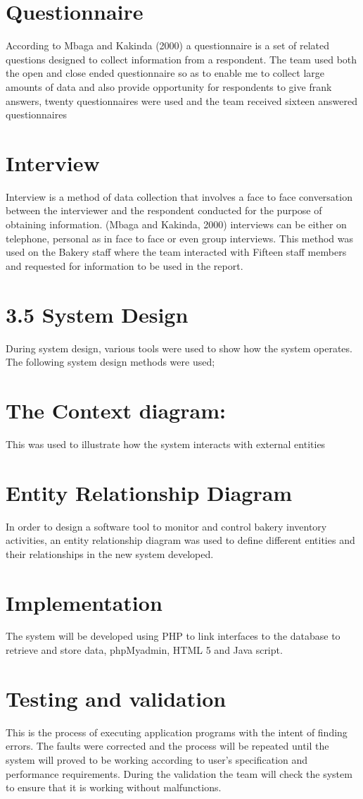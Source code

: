 \documentclass[options]{article}
\begin{document}
\section{\textbf{Questionnaire}}
According to Mbaga and Kakinda (2000) a questionnaire is a set of related questions designed to collect information from a respondent. The team used both the open and close ended questionnaire so as to enable me to collect large amounts of data and also provide opportunity for respondents to give frank answers, twenty questionnaires were used and the team received sixteen answered questionnaires
\section{\textbf{Interview}}
Interview is a method of data collection that involves a face to face conversation between the interviewer and the respondent conducted for the purpose of obtaining information. (Mbaga and Kakinda, 2000) interviews can be either on telephone, personal as in face to face or even group interviews. This method was used on the Bakery staff where the team interacted with Fifteen staff members and requested for information to be used in the report. 
\section{\textbf{3.5 System Design}}
During system design, various tools were used to show how the system operates. The following system design methods were used;
\section{\textbf{The Context diagram:}}
 This was used to illustrate how the system interacts with external entities
\section{\textbf{Entity Relationship Diagram}}
In order to design a software tool to monitor and control bakery inventory activities, an entity relationship diagram was used to define different entities and their relationships in the new system developed. 
\section{\textbf{ Implementation}}
The system will be developed using PHP to link interfaces to the database to retrieve and store data, phpMyadmin, HTML 5 and Java script. 
\section{\textbf{Testing and validation}}
This is the process of executing application programs with the intent of finding errors. The faults were corrected and the process will be repeated until the system will proved to be working according to user’s specification and performance requirements. During the validation the team will check the system to ensure that it is working without malfunctions.
\end{document}
